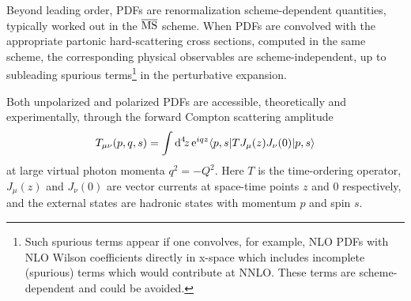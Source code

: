 Beyond leading order, PDFs are renormalization scheme-dependent 
quantities, typically worked out in the $\overline{\rm MS}$ scheme.
%
When PDFs are convolved with the appropriate partonic hard-scattering 
cross sections, computed in the same scheme, the corresponding physical 
observables are scheme-independent, up to subleading spurious 
terms\footnote{Such spurious terms appear if one convolves, for example, 
 NLO PDFs with NLO Wilson coefficients directly in x-space which includes 
 incomplete (spurious) terms which would contribute at NNLO. 
 These terms are scheme-dependent and could be avoided.} in the 
perturbative expansion. 

Both unpolarized and polarized PDFs are accessible, theoretically and 
experimentally, through the forward Compton scattering amplitude
\begin{equation}
\label{eq:Compton}
T_{\mu\nu}(p,q,s) 
= 
\int {\rm d}^4\!z\, {\rm e}^{iqz}  \langle p,s |T J_\mu(z) J_\nu(0)|p,s\rangle
\end{equation}
at large virtual photon momenta $q^2=-Q^2$. 
%
Here $T$ is the time-ordering operator, $J_\mu(z)$ and $J_\nu(0)$ are vector
currents at space-time points $z$ and $0$ respectively, and the 
external states are hadronic states with momentum $p$ and spin $s$.


